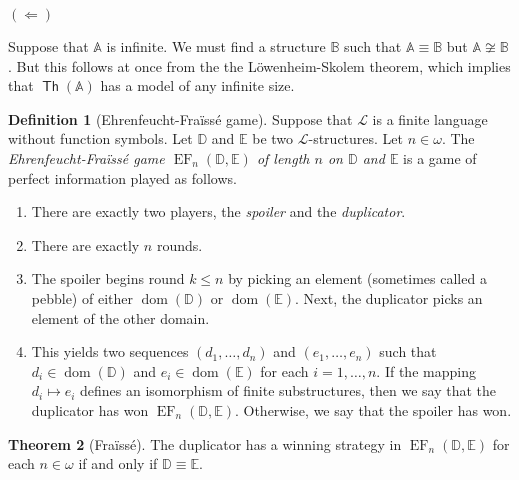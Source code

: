 \documentclass[10pt,letterpaper,cm]{nupset}
\theoremstyle{definition}
\newtheorem{definition}{Definition}
\theoremstyle{theorem}
\newtheorem{theorem}[definition]{Theorem}
\theoremstyle{remark}
\newcommand{\A}{\mathbb A}
\newcommand{\D}{\mathbb D}
\newcommand{\E}{\mathbb E}
\renewcommand{\L}{\mathcal L}
\newcommand{\B}{\mathbb{B}}
\newcommand{\1}{\mathbb{1}}
\renewcommand{\i}{\vec i}
\newcommand{\0}{\vec 0}
\DeclareMathOperator{\dom}{dom}
\DeclareMathOperator{\ef}{EF}
\DeclareMathOperator{\thh}{\mathsf{Th}}
\begin{document}
\begin{solution}
\medskip

$(\Longleftarrow)$

\smallskip

Suppose that $\A$ is infinite. We must find a structure $\B$ such that $\A \equiv \B$ but $\A \not\cong \B$. But this follows at once from the the L\"owenheim-Skolem theorem, which implies that $\thh(\A)$ has a model of any infinite size. 

\end{solution}

\medskip

\begin{definition}[Ehrenfeucht-Fra\"{\i}ss\'e  game]
Suppose that $\L$ is a finite language without function symbols. Let $\D$ and $\E$ be two $\L$-structures. Let $n\in \omega$. The \textit{Ehrenfeucht-Fra\"{\i}ss\'e  game $\ef_n(\D, \E)$ of length $n$ on $\D$ and $\E$} is a game of perfect information played as follows.
\begin{enumerate}[label=(\alph*)]
\item There are exactly two players, the \textit{spoiler} and the \textit{duplicator}.
\item There are exactly $n$ rounds.
\item The spoiler begins round $k\leq n$ by picking an element (sometimes called a pebble) of either $\dom(\D)$ or $\dom(\E)$. Next, the duplicator picks an element of the other domain.
\item This yields two sequences $\left(d_1, \ldots, d_n\right)$ and $\left(e_1, \ldots, e_n\right)$ such that $d_i\in \dom(\D)$ and $e_i\in \dom(\E)$ for each $i=1, \ldots, n$.  If the mapping $d_i \mapsto e_i$ defines an isomorphism of finite substructures, then we say that the duplicator has won $\ef_n(\D, \E)$. Otherwise, we say that the spoiler has won.
\end{enumerate}
\end{definition}

\begin{theorem}[Fra\"{\i}ss\'e]\label{EF}
The duplicator has a winning strategy in $\ef_n(\D, \E)$ for each $n\in \omega$ if and only if $\D \equiv \E$.
\end{theorem}
\end{document}
